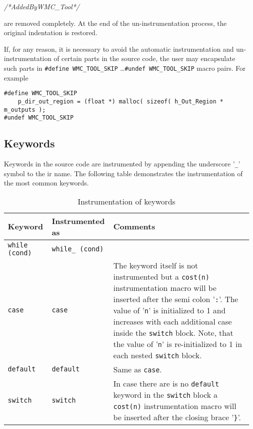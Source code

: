 {
{\em /*AddedByWMC\_Tool*/} 
}

are removed completely. At the end of the un-instrumentation process, the original indentation is restored.

If, for any reason, it is necessary to avoid the automatic instrumentation and un-instrumentation of certain parts in the source code, the user may encapsulate such parts in \verb|#define WMC_TOOL_SKIP| \ldots \verb|#undef WMC_TOOL_SKIP| macro pairs. For example

\begin{Verbatim}[fontsize=\small]
#define WMC_TOOL_SKIP
    p_dir_out_region = (float *) malloc( sizeof( h_Out_Region * m_outputs );
#undef WMC_TOOL_SKIP
\end{Verbatim}

\subsection{Keywords}

Keywords in the source code are instrumented by appending the underscore '\verb|_|' symbol to the ir name. The following table demonstrates the instrumentation of the most common keywords.

\begin{table}
\raggedleft\small
\caption{Instrumentation of keywords}
\begin{tabular}{|l|p{}<{\raggedright}|p{}<{\raggedright}|}
\hline
\textbf{Keyword} & \textbf{Instrumented as} & \textbf{Comments} \\
\hline
\verb|while (cond)| & \verb|while_ (cond)| & \\
\hline
\verb|case| & \verb|case| & The keyword itself is not instrumented but a \verb|cost(n)| instrumentation macro will be inserted after the semi colon '\verb|:|'. The value of '\verb|n|' is initialized to 1 and increases with each additional case inside the \verb|switch| block. Note, that the value of '\verb|n|' is re-initialized to 1 in each nested \verb|switch| block. \\
\hline
\verb|default| & \verb|default| & Same as \verb|case|. \\
\hline
\verb|switch| & \verb|switch| & In case there are is no \verb|default| keyword in the \verb|switch| block a \verb|cost(n)| instrumentation macro will be inserted after the closing brace '\verb|}|'. \\
\hline
\end{tabular}
\label{tab:instrumentation_of_keywords}
\end{table}

